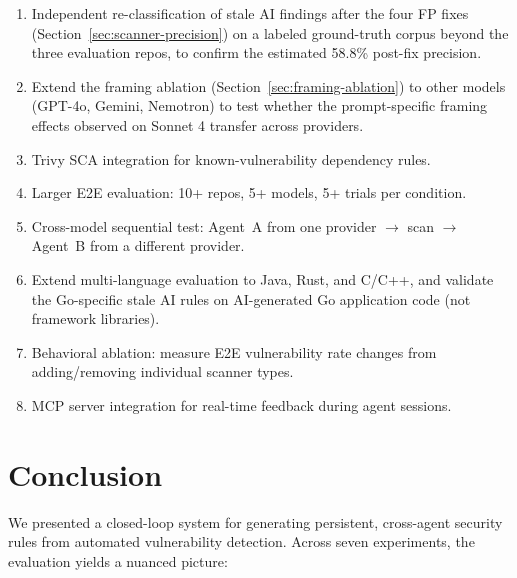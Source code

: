 \documentclass[conference,10pt]{IEEEtran}
\begin{document}
\begin{enumerate}
    \item Independent re-classification of stale AI findings after the four FP fixes (Section~\ref{sec:scanner-precision}) on a labeled ground-truth corpus beyond the three evaluation repos, to confirm the estimated 58.8\% post-fix precision.
    \item Extend the framing ablation (Section~\ref{sec:framing-ablation}) to other models (GPT-4o, Gemini, Nemotron) to test whether the prompt-specific framing effects observed on Sonnet 4 transfer across providers.
    \item Trivy SCA integration for known-vulnerability dependency rules.
    \item Larger E2E evaluation: 10+ repos, 5+ models, 5+ trials per condition.
    \item Cross-model sequential test: Agent~A from one provider $\rightarrow$ scan $\rightarrow$ Agent~B from a different provider.
    \item Extend multi-language evaluation to Java, Rust, and C/C++, and validate the Go-specific stale AI rules on AI-generated Go application code (not framework libraries).
    \item Behavioral ablation: measure E2E vulnerability rate changes from adding/removing individual scanner types.
    \item MCP server integration for real-time feedback during agent sessions.
\end{enumerate}

\section{Conclusion}

We presented a closed-loop system for generating persistent, cross-agent security rules from automated vulnerability detection. Across seven experiments, the evaluation yields a nuanced picture:
\end{document}

